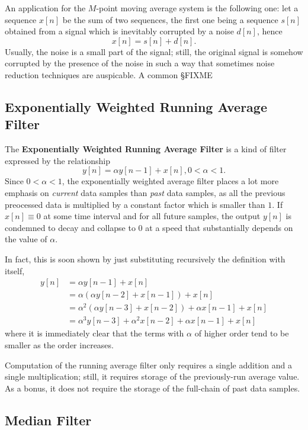 \documentclass[\documentfontsize, twocolumn]{\classname}
\begin{document}
An application for the $M$-point moving average system is the following one: let a sequence $x[n]$ be the sum of two sequences, the first one being a sequence $s[n]$ obtained from a signal which is inevitably corrupted by a noise $d[n]$, hence \[x[n] = s[n] + d[n].\] Usually, the noise is a small part of the signal; still, the original signal is somehow corrupted by the presence of the noise in such a way that sometimes noise reduction techniques are auspicable. A common §FIXME

\subsection{Exponentially Weighted Running Average Filter}

The \textbf{Exponentially Weighted Running Average Filter} is a kind of filter expressed by the relationship
\begin{equation}\label{eqn:exponentiallyWeightedRunningAverageFilterEquation}
    y[n] = \alpha y[n-1] + x[n], 0 < \alpha < 1.
\end{equation}
Since $0 < \alpha < 1$, the exponentially weighted average filter places a lot more emphasis on \emph{current} data samples than \emph{past} data samples, as all the previous preocessed data is multiplied by a constant factor which is smaller than $1$. If $x[n]\equiv 0$ at some time interval and for all future samples, the output $y[n]$ is condemned to decay and collapse to $0$ at a speed that substantially depends on the value of $\alpha$.

In fact, this is soon shown by just substituting recursively the definition with itself,
\begin{align*}
    y[n] &= \alpha y[n-1] + x[n]\\
         &= \alpha(\alpha y[n-2] + x[n-1]) + x[n]\\
         &= \alpha^2(\alpha y[n-3] + x[n-2]) + \alpha x[n-1] + x[n]\\
         &= \alpha^3y[n-3] + \alpha^2 x[n-2] + \alpha x[n-1] + x[n]
\end{align*}
where it is immediately clear that the terms with $\alpha$ of higher order tend to be smaller as the order increases.

Computation of the running average filter only requires a single addition and a single multiplication; still, it requires storage of the previously-run average value. As a bonus, it does not require the storage of the full-chain of past data samples.

\subsection{Median Filter}
\end{document}
